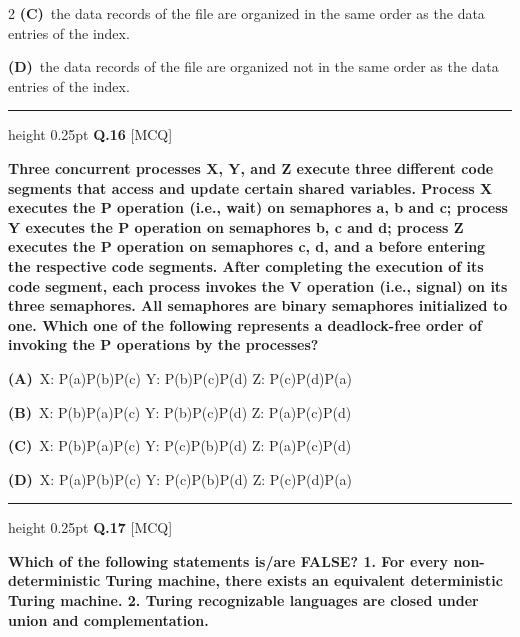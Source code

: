 \documentclass[a4paper,10pt,twoside]{article}
\begin{document}
\begin{multicols}{2}
\textbf{(C)}~the data records of the file are organized in the same order as the data entries of the index.\par\vspace{2pt}\noindent
\textbf{(D)}~the data records of the file are organized not in the same order as the data entries of the index.
\par\vspace{6pt}\hrule height 0.25pt\vspace{6pt}
\noindent\textbf{Q.16} \hfill {\footnotesize\textsf{[MCQ]}}
\par\vspace{2pt}
{\bfseries Three concurrent processes X, Y, and Z execute three different code segments that access and
update certain shared variables. Process X executes the P operation (i.e., wait) on semaphores
a, b and c; process Y executes the P operation on semaphores b, c and d; process Z executes the
P operation on semaphores c, d, and a before entering the respective code segments. After
completing the execution of its code segment, each process invokes the V operation (i.e., signal) on
its three semaphores. All semaphores are binary semaphores initialized to one. Which one of the
following represents a deadlock-free order of invoking the P operations by the processes? \par}
\par\vspace{2pt}\noindent
\textbf{(A)}~X: P(a)P(b)P(c) Y: P(b)P(c)P(d) Z: P(c)P(d)P(a)\par\vspace{2pt}\noindent
\textbf{(B)}~X: P(b)P(a)P(c) Y: P(b)P(c)P(d) Z: P(a)P(c)P(d)\par\vspace{2pt}\noindent
\textbf{(C)}~X: P(b)P(a)P(c) Y: P(c)P(b)P(d) Z: P(a)P(c)P(d)\par\vspace{2pt}\noindent
\textbf{(D)}~X: P(a)P(b)P(c) Y: P(c)P(b)P(d) Z: P(c)P(d)P(a)
\par\vspace{6pt}\hrule height 0.25pt\vspace{6pt}
\noindent\textbf{Q.17} \hfill {\footnotesize\textsf{[MCQ]}}
\par\vspace{2pt}
{\bfseries Which of the following statements is/are FALSE?
1. For every non-deterministic Turing machine, there exists an equivalent deterministic
Turing machine.
2. Turing recognizable languages are closed under union and complementation.
}
\end{multicols}
\end{document}
